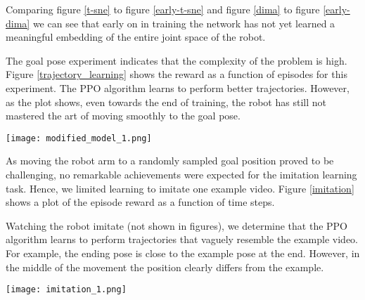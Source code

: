Comparing figure \ref{t-sne} to figure \ref{early-t-sne} and figure \ref{dima} to figure \ref{early-dima} we can see that early on in training the network has not yet learned a meaningful embedding of the entire joint space of the robot.

The goal pose experiment indicates that the complexity of the problem is high. Figure \ref{trajectory_learning} shows the reward as a function of episodes for this experiment. The PPO algorithm learns to perform better trajectories. However, as the plot shows, even towards the end of training, the robot has still not mastered the art of moving smoothly to the goal pose.

{
    \centering
    \texttt{[image: modified\_model\_1.png]}
    \label{trajectory_learning}
    \vspace{0.25cm}
}

As moving the robot arm to a randomly sampled goal position proved to be challenging, no remarkable achievements were expected for the imitation learning task. Hence, we limited learning to imitate one example video. Figure \ref{imitation} shows a plot of the episode reward as a function of time steps.

Watching the robot imitate (not shown in figures), we determine that the PPO algorithm learns to perform trajectories that vaguely resemble the example video. For example, the ending pose is close to the example pose at the end. However, in the middle of the movement the position clearly differs from the example.

{
    \centering
    \texttt{[image: imitation\_1.png]}
    \label{imitation}
    \vspace{0.25cm}
}